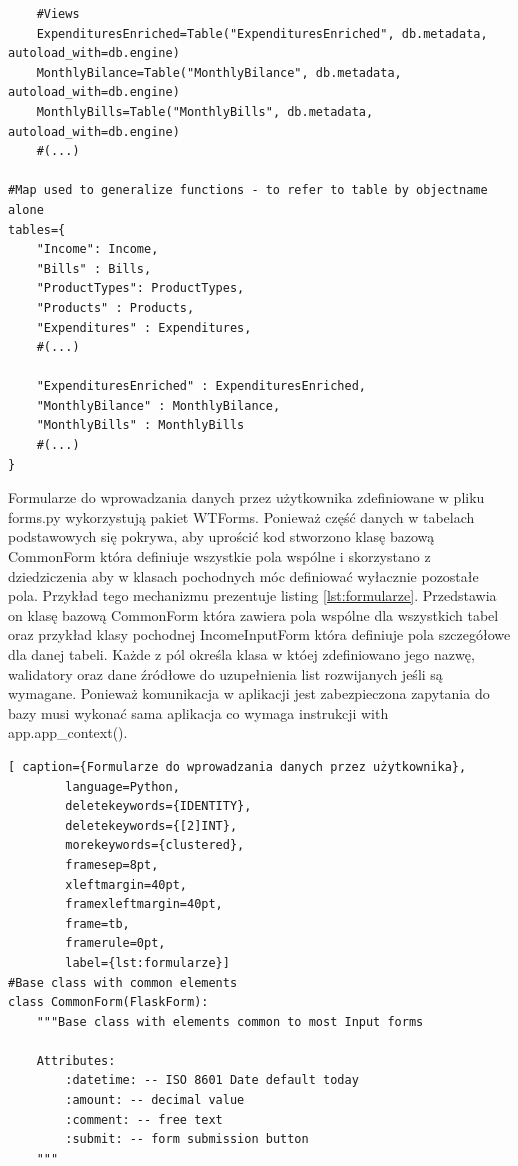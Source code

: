 \documentclass[a4paper, 10pt, twoside, openright]{report}
\begin{document}
\begin{large}
\begin{minipage}{\textwidth}
\begin{lstlisting}
    #Views
    ExpendituresEnriched=Table("ExpendituresEnriched", db.metadata, autoload_with=db.engine)
    MonthlyBilance=Table("MonthlyBilance", db.metadata, autoload_with=db.engine)
    MonthlyBills=Table("MonthlyBills", db.metadata, autoload_with=db.engine)
    #(...)

#Map used to generalize functions - to refer to table by objectname alone
tables={
    "Income": Income,
    "Bills" : Bills,
    "ProductTypes": ProductTypes,
    "Products" : Products,
    "Expenditures" : Expenditures,
    #(...)

    "ExpendituresEnriched" : ExpendituresEnriched,
    "MonthlyBilance" : MonthlyBilance,
    "MonthlyBills" : MonthlyBills
    #(...)
}\end{lstlisting}
\end{minipage}

{Formularze do wprowadzania danych przez użytkownika zdefiniowane w pliku 
forms.py wykorzystują pakiet WTForms. Ponieważ część danych w tabelach 
podstawowych się pokrywa, aby uprościć kod stworzono klasę bazową CommonForm 
która definiuje wszystkie pola wspólne i skorzystano z dziedziczenia aby w 
klasach pochodnych móc definiować wyłacznie pozostałe pola. Przykład tego 
mechanizmu prezentuje listing \ref*{lst:formularze}. Przedstawia on klasę bazową
 CommonForm która zawiera pola wspólne dla wszystkich tabel oraz przykład klasy 
pochodnej IncomeInputForm która definiuje pola szczegółowe dla danej tabeli. 
Każde z pól określa klasa w któej zdefiniowano jego nazwę, walidatory oraz dane 
źródłowe do uzupełnienia list rozwijanych jeśli są wymagane. Ponieważ 
komunikacja w aplikacji jest zabezpieczona zapytania do bazy musi wykonać sama 
aplikacja co wymaga instrukcji with app.app\_context().}

\begin{minipage}{\textwidth}
    \begin{lstlisting}[ caption={Formularze do wprowadzania danych przez użytkownika},
        language=Python,
        deletekeywords={IDENTITY},
        deletekeywords={[2]INT},
        morekeywords={clustered},
        framesep=8pt,
        xleftmargin=40pt,
        framexleftmargin=40pt,
        frame=tb,
        framerule=0pt,
        label={lst:formularze}]
#Base class with common elements
class CommonForm(FlaskForm):
    """Base class with elements common to most Input forms
    
    Attributes:
        :datetime: -- ISO 8601 Date default today
        :amount: -- decimal value
        :comment: -- free text
        :submit: -- form submission button
    """


\end{lstlisting}
\end{minipage}
\end{large}
\end{document}

